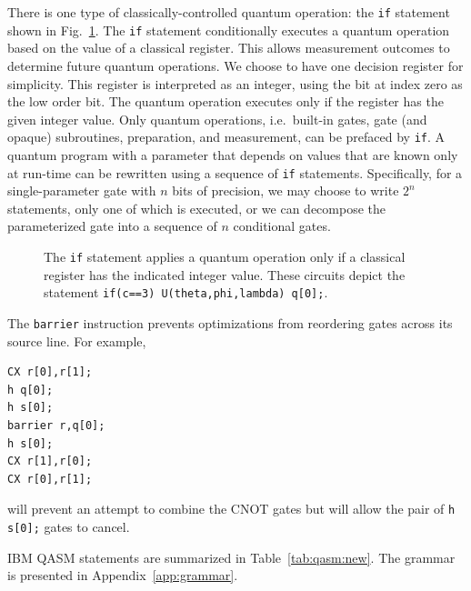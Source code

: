 \documentclass[USenglish,12pt,fleqn]{article} %
\newcommand*{\code}{\texttt}
\begin{document}
There is one type of classically-controlled quantum operation: the \code{if} statement shown in Fig.~\ref{fig:if}. The \code{if} statement conditionally executes a quantum operation based on the value of a classical register. This allows measurement outcomes to determine future quantum operations. We choose to have one decision register for simplicity. This register is interpreted as an integer, using the bit at index zero as the low order bit. The quantum operation executes only if the register has the given integer value. Only quantum operations, i.e.\ built-in gates, gate (and opaque) subroutines, preparation, and measurement, can be prefaced by \code{if}. A quantum program with a parameter that depends on values that are known only at run-time can be rewritten using a sequence of \code{if} statements. Specifically, for a single-parameter gate with $n$ bits of precision, we may choose to write $2^n$ statements, only one of which is executed, or we can decompose the parameterized gate into a sequence of $n$ conditional gates.

\begin{figure}
\centering
\begin{minipage}{.3\textwidth}
\centering

\end{minipage}
\begin{minipage}{.3\textwidth}
\centering
\end{minipage}
\caption{The \code{if} statement applies a quantum operation only if a classical register has the indicated integer value. These circuits depict the statement \code{if(c==3) U(theta,phi,lambda) q[0];}.
\label{fig:if}}
\end{figure}

The \code{barrier} instruction prevents optimizations from reordering gates across its source line. For example,
\begin{verbatim}
CX r[0],r[1]; 
h q[0]; 
h s[0];
barrier r,q[0];
h s[0]; 
CX r[1],r[0]; 
CX r[0],r[1];
\end{verbatim}
will prevent an attempt to combine the CNOT gates but will allow the pair of \code{h s[0];} gates to cancel.

IBM QASM statements are summarized in Table~\ref{tab:qasm:new}. The grammar is presented in Appendix~\ref{app:grammar}.
\end{document}
